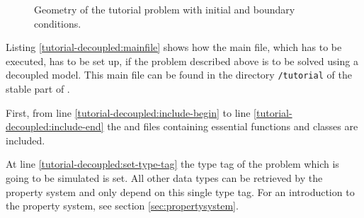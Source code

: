 \begin{figure}[ht]
\centering
{}
\caption{Geometry of the tutorial problem with initial and boundary conditions.}\label{tutorial-decoupled:problemfigure}
\end{figure}

Listing \ref{tutorial-decoupled:mainfile} shows how the main file, which has to be executed, has to be set up, if the problem described above is to be solved using a decoupled model. This main file can be found in the directory \texttt{/tutorial} of the stable part of \Dumux.

\begin{lst}\label{tutorial-decoupled:mainfile} \mbox{}

\end{lst}

First, from line \ref{tutorial-decoupled:include-begin} to line
\ref{tutorial-decoupled:include-end} the \Dune and \Dumux files containing
essential functions and classes are included.

At line \ref{tutorial-decoupled:set-type-tag} the type tag of the
problem which is going to be simulated is set. All other data types
can be retrieved by the \Dumux property system and only depend on this
single type tag. For an introduction to the
property system, see section \ref{sec:propertysystem}.

